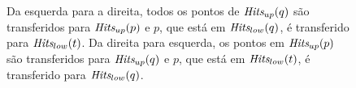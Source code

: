 \begin{figure}[h]
    \caption{Da esquerda para a direita,
    todos os pontos de $\textit{Hits}_{up}(q)$
    são transferidos para $\textit{Hits}_{up}(p)$
    e $p$, que está em $\textit{Hits}_{low}(q)$,
    é transferido para $\textit{Hits}_{low}(t)$.
    Da direita para esquerda, os pontos
    em $\textit{Hits}_{up}(p)$ são transferidos
    para $\textit{Hits}_{up}(q)$ e $p$, que está
    em $\textit{Hits}_{low}(t)$, é transferido
    para $\textit{Hits}_{low}(q)$.}
    \label{fig:parcinetico:eventouptnaoexiste}
\end{figure}